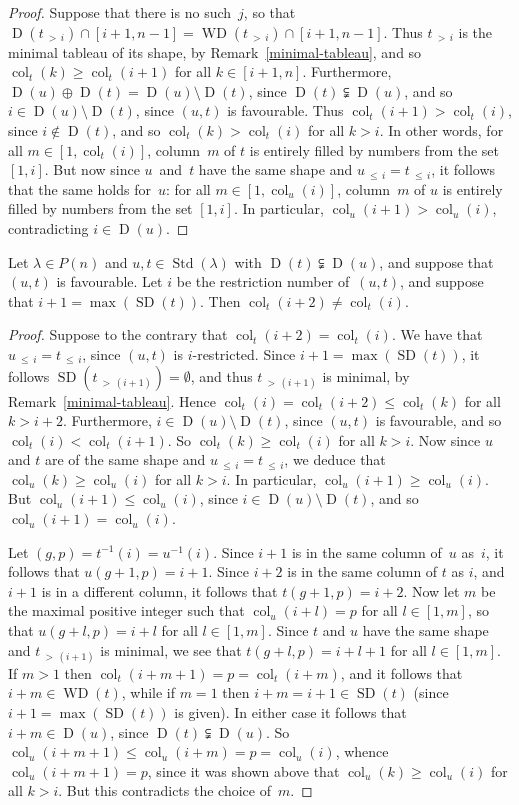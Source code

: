 \documentclass[ALCO,ThmDefs,Unicode,epreuves]{cedram}
\DeclareMathOperator{\col}{col}
\newcommand{\morethan}[2]{#1\,{_{>\,#2}}}
\newcommand{\Lessthan}[2]{#1\,{_{\leqslant\,#2}}}
\DeclareMathOperator{\STD}{Std}
\DeclareMathOperator{\SD}{SD}
\DeclareMathOperator{\WD}{WD}
\DeclareMathOperator{\D}{D}
\begin{document}
\begin{proof}
Suppose that there is no such~$j$, so that
$\D(\morethan ti)\cap [i+1,n-1]=\WD(\morethan ti)\cap [i+1,n-1]$.
Thus $\morethan ti$ is the minimal tableau of its shape, by Remark~\ref{minimal-tableau},
and so $\col_t(k)\geqslant\col_t(i+1)$ for all $k\in[i+1,n]$.
Furthermore, $\D(u)\oplus\D(t)=\D(u)\setminus\D(t)$, since $\D(t)\subsetneqq\D(u)$,
and so $i\in\D(u)\setminus\D(t)$, since $(u,t)$ is favourable.
Thus $\col_t(i+1)>\col_t(i)$, since $i\notin\D(t)$, and so
$\col_t(k)>\col_t(i)$ for all $k>i$. In other words, for all
$m\in[1,\col_t(i)]$, column~$m$ of $t$ is entirely filled by numbers
from the set $[1,i]$. But now since $u$~and~$t$ have the same shape and
$\Lessthan ui=\Lessthan ti$, it follows that the same holds for~$u$: for all
$m\in[1,\col_u(i)]$, column~$m$ of $u$ is entirely filled by numbers
from the set $[1,i]$. In particular, $\col_u(i+1)>\col_u(i)$, contradicting $i\in\D(u)$.
\end{proof}

\begin{lemm}\label{existencef}
Let $\lambda\in P(n)$ and $u,t\in\STD(\lambda)$ with $\D(t)\subsetneqq\D(u)$,
and suppose that $(u,t)$ is favourable.
Let $i$ be the restriction number of~$(u,t)$, and suppose that $i+1=\max(\SD(t))$. Then
$\col_{t}(i+2)\neq\col_t(i)$.
\end{lemm}

\begin{proof}
Suppose to the contrary that $\col_{t}(i+2)=\col_t(i)$. We have that
$\Lessthan ui=\Lessthan ti$, since $(u,t)$ is $i$-restricted.
Since $i+1=\max(\SD(t))$, it follows
$\SD(\morethan t{(i+1)})=\emptyset$, and thus $\morethan t{(i+1)}$ is
minimal, by Remark~\ref{minimal-tableau}. Hence
$\col_t(i)=\col_t(i+2)\leqslant\col_t(k)$ for all $k>i+2$.
Furthermore, $i\in\D(u)\setminus\D(t)$, since $(u,t)$ is favourable,
and so $\col_t(i)<\col_t(i+1)$. So $\col_t(k)\geqslant\col_t(i)$ for
all $k>i$. Now since $u$ and $t$ are of the same shape and
$\Lessthan ui=\Lessthan ti$, we deduce that $\col_u(k)\geqslant\col_u(i)$
for all $k>i$. In particular, $\col_u(i+1)\geqslant\col_u(i)$.
But $\col_u(i+1)\leqslant\col_u(i)$, since $i\in\D(u)\setminus\D(t)$,
and so $\col_u(i+1)=\col_u(i)$.

Let $(g,p)=t^{-1}(i)=u^{-1}(i)$. Since $i+1$ is in the same column of~$u$
as~$i$, it follows that $u(g+1,p)=i+1$. Since $i+2$ is in the same column
of $t$ as $i$, and $i+1$ is in a different column, it follows that
$t(g+1,p)=i+2$. Now let $m$ be the maximal positive integer such that
$\col_u(i+l)=p$ for all $l\in[1,m]$, so that
$u(g+l,p)=i+l$ for all $l\in[1,m]$. Since $t$ and $u$ have the
same shape and $\morethan t{(i+1)}$ is minimal, we see that
$t(g+l,p)=i+l+1$ for all $l\in[1,m]$.
If $m>1$ then $\col_t(i+m+1)=p=\col_t(i+m)$,
and it follows that $i+m\in\WD(t)$, while if $m=1$ then $i+m=i+1\in\SD(t)$
(since $i+1=\max(\SD(t))$ is given). In either case it follows that
$i+m\in\D(u)$, since $\D(t)\subsetneqq\D(u)$. So
$\col_u(i+m+1)\leqslant\col_u(i+m)=p=\col_u(i)$, whence $\col_u(i+m+1)=p$,
since it was shown above that $\col_u(k)\geqslant\col_u(i)$ for
all $k>i$. But this contradicts the choice of~$m$.
\end{proof}
\end{document}
